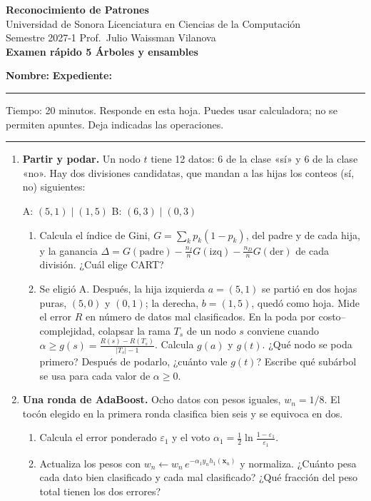 \documentclass[11pt]{article}
\newcommand{\vx}{\mathbf{x}}
\newcommand{\encabezado}[2]{%
\begin{center}
{\large\bfseries Reconocimiento de Patrones}\\[2pt]
Universidad de Sonora \textperiodcentered{} Licenciatura en Ciencias de la Computación\\
Semestre 2027-1 \textperiodcentered{} Prof.\ Julio Waissman Vilanova\\[10pt]
{\Large\bfseries #1}%
\ifdefined\tipodoc\\[4pt]{\large\itshape\tipodoc}\fi
\end{center}
\ifdefined\tipodoc\else
\vspace{6pt}
\textbf{Nombre:} \hrulefill\quad \textbf{Expediente:} \rule{3.5cm}{0.4pt}\par
\vspace{6pt}
\fi
#2
\par\medskip\hrule\medskip
}
\newcommand{\espacio}[1]{\par\vspace{#1}}
\newcommand{\nuevapagina}{\newpage}
\begin{document}
\encabezado{Examen rápido 5 \textperiodcentered{} Árboles y ensambles}{%
Tiempo: 20 minutos. Responde en esta hoja. Puedes usar calculadora; no se permiten apuntes. Deja indicadas las operaciones.}

\begin{enumerate}

\item \textbf{Partir y podar.} Un nodo $t$ tiene 12 datos: 6 de la clase «sí» y 6 de la clase «no». Hay dos divisiones candidatas, que mandan a las hijas los conteos (sí, no) siguientes:
\begin{center}
A: $(5, 1) \mid (1, 5)$ \qquad\qquad B: $(6, 3) \mid (0, 3)$
\end{center}
\begin{enumerate}
  \item Calcula el índice de Gini, $G = \sum_k p_k(1 - p_k)$, del padre y de cada hija, y la ganancia $\Delta = G(\text{padre}) - \frac{n_I}{n}G(\text{izq}) - \frac{n_D}{n}G(\text{der})$ de cada división. ¿Cuál elige CART?
  \espacio{4.5cm}

  \item Se eligió A. Después, la hija izquierda $a = (5, 1)$ se partió en dos hojas puras, $(5, 0)$ y $(0, 1)$; la derecha, $b = (1, 5)$, quedó como hoja. Mide el error $R$ en número de datos mal clasificados. En la poda por costo–complejidad, colapsar la rama $T_s$ de un nodo $s$ conviene cuando $\alpha \ge g(s) = \frac{R(s) - R(T_s)}{|T_s| - 1}$. Calcula $g(a)$ y $g(t)$. ¿Qué nodo se poda primero? Después de podarlo, ¿cuánto vale $g(t)$? Escribe qué subárbol se usa para cada valor de $\alpha \ge 0$.
  \espacio{5cm}
\end{enumerate}

\nuevapagina
\item \textbf{Una ronda de AdaBoost.} Ocho datos con pesos iguales, $w_n = 1/8$. El tocón elegido en la primera ronda clasifica bien seis y se equivoca en dos.
\begin{enumerate}
  \item Calcula el error ponderado $\varepsilon_1$ y el voto $\alpha_1 = \frac12 \ln\frac{1 - \varepsilon_1}{\varepsilon_1}$.
  \espacio{2.2cm}

  \item Actualiza los pesos con $w_n \leftarrow w_n\, e^{-\alpha_1 y_n h_1(\vx_n)}$ y normaliza. ¿Cuánto pesa cada dato bien clasificado y cada mal clasificado? ¿Qué fracción del peso total tienen los dos errores?
  \espacio{3.5cm}


\end{enumerate}
\end{enumerate}
\end{document}
